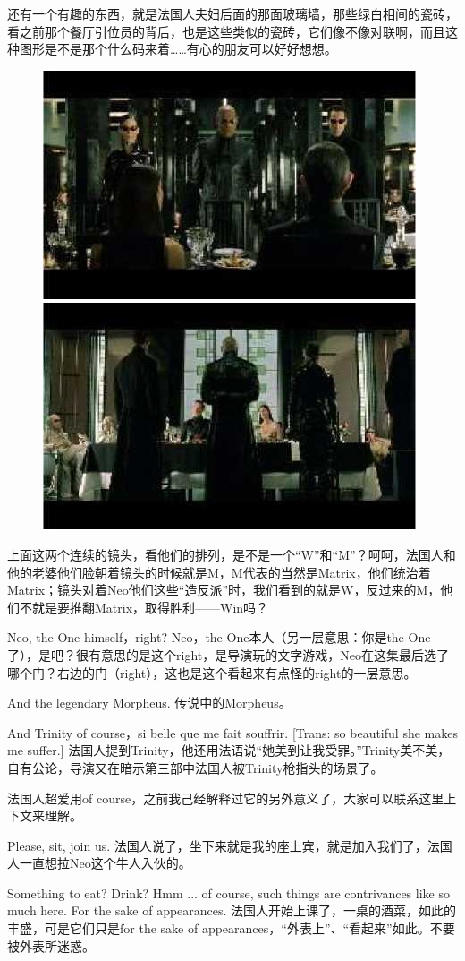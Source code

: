 \documentclass{ctexart}
\begin{document}
还有一个有趣的东西，就是法国人夫妇后面的那面玻璃墙，那些绿白相间的瓷砖，看之前那个餐厅引位员的背后，也是这些类似的瓷砖，它们像不像对联啊，而且这种图形是不是那个什么码来着……有心的朋友可以好好想想。

\begin{figure}[htb]
\centering
\includegraphics[width=0.45\linewidth]{fig/read_reloaded-91}
\includegraphics[width=0.45\linewidth]{fig/read_reloaded-91-1}
\end{figure}

上面这两个连续的镜头，看他们的排列，是不是一个“W”和“M”？呵呵，法国人和他的老婆他们脸朝着镜头的时候就是M，M代表的当然是Matrix，他们统治着Matrix；镜头对着Neo他们这些“造反派”时，我们看到的就是W，反过来的M，他们不就是要推翻Matrix，取得胜利——Win吗？

Neo, the One himself，right? Neo，the One本人（另一层意思：你是the One了），是吧？很有意思的是这个right，是导演玩的文字游戏，Neo在这集最后选了哪个门？右边的门（right），这也是这个看起来有点怪的right的一层意思。

And the legendary Morpheus. 传说中的Morpheus。

And Trinity of course，si belle que me fait souffrir. [Trans: so beautiful she makes me suffer.] 法国人提到Trinity，他还用法语说“她美到让我受罪。”Trinity美不美，自有公论，导演又在暗示第三部中法国人被Trinity枪指头的场景了。

法国人超爱用of course，之前我己经解释过它的另外意义了，大家可以联系这里上下文来理解。

Please, sit, join us. 法国人说了，坐下来就是我的座上宾，就是加入我们了，法国人一直想拉Neo这个牛人入伙的。

Something to eat? Drink? Hmm ... of course, such things are contrivances like so much here. For the sake of appearances. 法国人开始上课了，一桌的酒菜，如此的丰盛，可是它们只是for the sake of appearances，“外表上”、“看起来”如此。不要被外表所迷惑。
\end{document}

